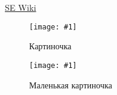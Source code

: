 \documentclass[12pt]{article}
\newcommand{\javacode}[1]{
  \lstset{style=java-style}
  
}
\newcommand{\xmlcode}[1]{
  \lstset{style=xml-style}
  
}
\newcommand{\image}[2]{
  \begin{figure}[h!]
   \centering
    \texttt{[image: \#1]}
   \caption{#2}
  \end{figure}
}
\begin{document}
\href{http://mit.spbau.ru/sewiki/index.php/SE_Wiki}{SE Wiki}

\image{example/studio_example.png}{Картиночка}
\image{example/viewgroup.png}{Маленькая картиночка}

\javacode{example/example.java}

\pagebreak

\xmlcode{example/example.xml}
\end{document}
